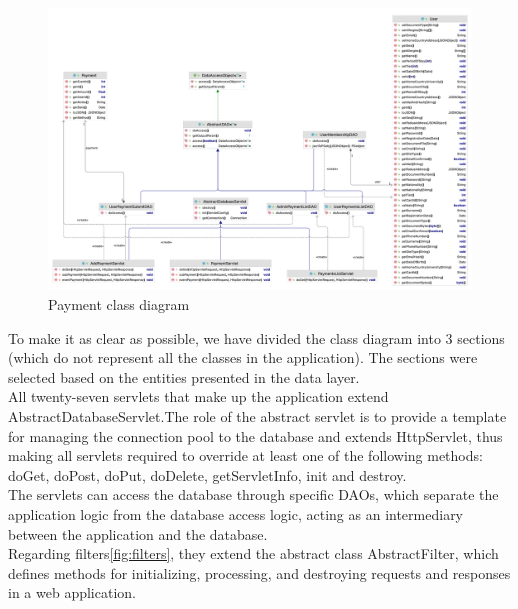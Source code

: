 \begin{figure}[H]
    \centering
    \includegraphics[width=1\textwidth]{images/classPaymentUser.png}
    \caption{Payment class diagram}
    \label{fig:payment}
\end{figure}

To make it as clear as possible, we have divided the class diagram into 3 sections (which do not represent all the classes in the application). The sections were selected based on the entities presented in the data layer.\\
All twenty-seven servlets that make up the application extend AbstractDatabaseServlet.The role of the abstract servlet is to provide a template for managing the connection pool to the database and extends HttpServlet, thus making all servlets required to override at least one of the following methods: doGet, doPost, doPut, doDelete, getServletInfo, init and destroy.\\
The servlets can access the database through specific DAOs, which separate the application logic from the database access logic, acting as an intermediary between the application and the database.\\
Regarding filters\ref{fig:filters}, they extend the abstract class AbstractFilter, which defines methods for initializing, processing, and destroying requests and responses in a web application.